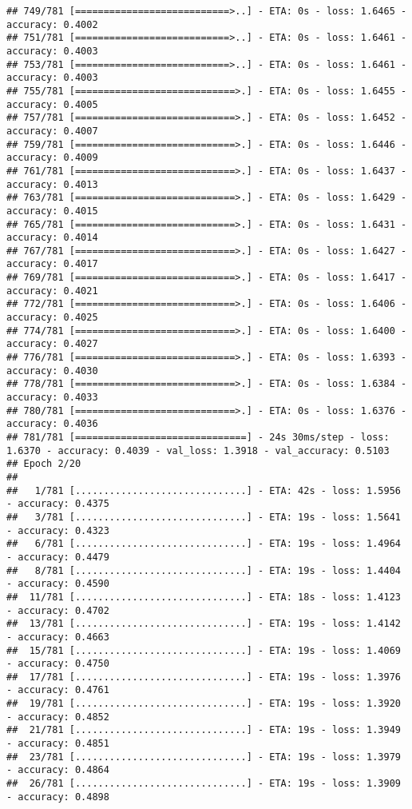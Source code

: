 \documentclass[
]{article}
\begin{document}
\begin{verbatim}
## 749/781 [===========================>..] - ETA: 0s - loss: 1.6465 - accuracy: 0.4002
## 751/781 [===========================>..] - ETA: 0s - loss: 1.6461 - accuracy: 0.4003
## 753/781 [===========================>..] - ETA: 0s - loss: 1.6461 - accuracy: 0.4003
## 755/781 [============================>.] - ETA: 0s - loss: 1.6455 - accuracy: 0.4005
## 757/781 [============================>.] - ETA: 0s - loss: 1.6452 - accuracy: 0.4007
## 759/781 [============================>.] - ETA: 0s - loss: 1.6446 - accuracy: 0.4009
## 761/781 [============================>.] - ETA: 0s - loss: 1.6437 - accuracy: 0.4013
## 763/781 [============================>.] - ETA: 0s - loss: 1.6429 - accuracy: 0.4015
## 765/781 [============================>.] - ETA: 0s - loss: 1.6431 - accuracy: 0.4014
## 767/781 [============================>.] - ETA: 0s - loss: 1.6427 - accuracy: 0.4017
## 769/781 [============================>.] - ETA: 0s - loss: 1.6417 - accuracy: 0.4021
## 772/781 [============================>.] - ETA: 0s - loss: 1.6406 - accuracy: 0.4025
## 774/781 [============================>.] - ETA: 0s - loss: 1.6400 - accuracy: 0.4027
## 776/781 [============================>.] - ETA: 0s - loss: 1.6393 - accuracy: 0.4030
## 778/781 [============================>.] - ETA: 0s - loss: 1.6384 - accuracy: 0.4033
## 780/781 [============================>.] - ETA: 0s - loss: 1.6376 - accuracy: 0.4036
## 781/781 [==============================] - 24s 30ms/step - loss: 1.6370 - accuracy: 0.4039 - val_loss: 1.3918 - val_accuracy: 0.5103
## Epoch 2/20
## 
##   1/781 [..............................] - ETA: 42s - loss: 1.5956 - accuracy: 0.4375
##   3/781 [..............................] - ETA: 19s - loss: 1.5641 - accuracy: 0.4323
##   6/781 [..............................] - ETA: 19s - loss: 1.4964 - accuracy: 0.4479
##   8/781 [..............................] - ETA: 19s - loss: 1.4404 - accuracy: 0.4590
##  11/781 [..............................] - ETA: 18s - loss: 1.4123 - accuracy: 0.4702
##  13/781 [..............................] - ETA: 19s - loss: 1.4142 - accuracy: 0.4663
##  15/781 [..............................] - ETA: 19s - loss: 1.4069 - accuracy: 0.4750
##  17/781 [..............................] - ETA: 19s - loss: 1.3976 - accuracy: 0.4761
##  19/781 [..............................] - ETA: 19s - loss: 1.3920 - accuracy: 0.4852
##  21/781 [..............................] - ETA: 19s - loss: 1.3949 - accuracy: 0.4851
##  23/781 [..............................] - ETA: 19s - loss: 1.3979 - accuracy: 0.4864
##  26/781 [..............................] - ETA: 19s - loss: 1.3909 - accuracy: 0.4898

\end{verbatim}
\end{document}
